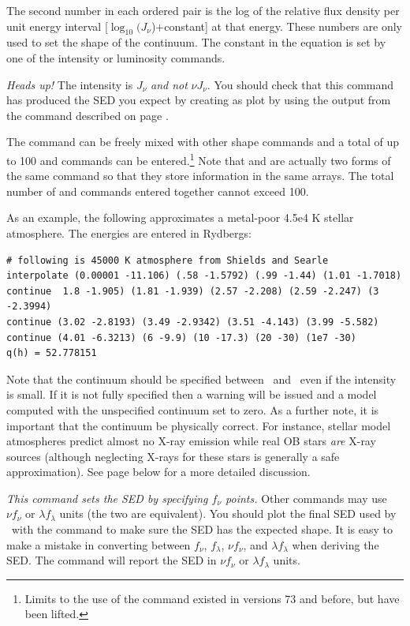 The second number in each ordered pair is the log of the relative flux
density per unit energy interval [$\log_{10}(J_\nu$)+constant] at that energy.
These
numbers are only used to set the shape of the continuum.
The constant in
the equation is set by one of the intensity or luminosity commands.

\emph{Heads up!}  The intensity is $J_\nu$ \emph{and not} $\nu J_\nu$.
You should check that this command has produced the SED you expect by creating
as plot by using the output from the  command
described on page \pageref{sec:CommandSaveIncidentContinuum}.

The  command can be freely mixed with other shape
commands and a total of up to 100  and  commands can be entered.\footnote{Limits to the
use of the
 command existed in versions 73
and before, but have been lifted.}  Note that  and
 are actually
two forms of the same command so that they store information in the same
arrays.
The total number of  and  commands entered together cannot exceed 100.

As an example, the following approximates a metal-poor 4.5e4 K stellar
atmosphere.  The energies are entered in Rydbergs:
\begin{verbatim}
# following is 45000 K atmosphere from Shields and Searle
interpolate (0.00001 -11.106) (.58 -1.5792) (.99 -1.44) (1.01 -1.7018)
continue  1.8 -1.905) (1.81 -1.939) (2.57 -2.208) (2.59 -2.247) (3 -2.3994)
continue (3.02 -2.8193) (3.49 -2.9342) (3.51 -4.143) (3.99 -5.582)
continue (4.01 -6.3213) (6 -9.9) (10 -17.3) (20 -30) (1e7 -30)
q(h) = 52.778151
\end{verbatim}
Note that the continuum should be specified between
\emm\ and
\egamry\ even if the intensity is small.
If it is not fully specified
then a warning will be issued and a model computed with the unspecified
continuum set to zero.
As a further note, it is important that the continuum
be physically correct.
For instance, stellar model atmospheres predict
almost no X-ray emission while real OB stars \emph{are} X-ray sources
(although neglecting X-rays for these stars is generally a safe
approximation).
See page \pageref{sec:StarHighEnergyComponent} below
for a more detailed discussion.

\emph{This command sets the SED by specifying $f_\nu$ points.}
Other commands may use $\nu f_\nu$ or $\lambda f_\lambda$ units (the two are equivalent).
You should plot the final SED used by \Cloudy\ with the
 command to make sure the SED has the expected shape.
It is easy to make a mistake in converting between $f_\nu$, $f_\lambda$,
$\nu f_\nu$, and $\lambda f_\lambda$ when deriving the SED.
The  command will report the SED in 
$\nu f_\nu$ or $\lambda f_\lambda$ units.

